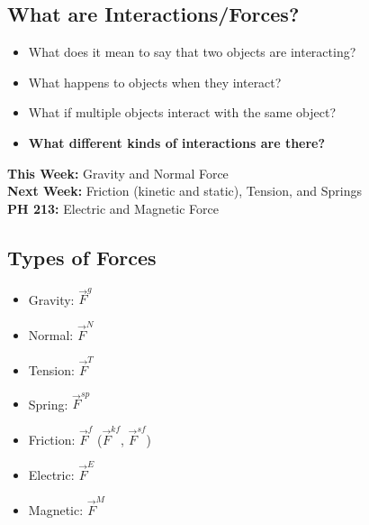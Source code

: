 \documentclass[]{article}
\begin{document}
\begin{PresentSpace}
\vspace{-10pt}
\section*{What are Interactions/Forces?}
\vspace{-10pt}
\begin{itemize}
	\item What does it mean to say that two objects are interacting?
	\item What happens to objects when they interact?
	\item What if multiple objects interact with the same object?
	\item \textbf{What different kinds of interactions are there?}
\end{itemize}
\end{PresentSpace}
\newpage
\begin{TeacherMargin}
\noindent\textbf{This Week:} Gravity and Normal Force \\
\textbf{Next Week:} Friction (kinetic and static), Tension, and Springs \\
\textbf{PH 213:} Electric and Magnetic Force
\end{TeacherMargin}
\begin{PresentSpace}
\vspace{-10pt}
\section*{Types of Forces}
\vspace{-10pt}
\begin{itemize}
	\item Gravity: $\vec{F}^{g}$
	\item Normal: $\vec{F}^{N}$
	\item Tension: $\vec{F}^{T}$
	\item Spring: $\vec{F}^{sp}$
	\item Friction: $\vec{F}^{f}$ ($\vec{F}^{kf}$, $\vec{F}^{sf}$)
	\item Electric: $\vec{F}^{E}$
	\item Magnetic: $\vec{F}^{M}$
\end{itemize}
\end{PresentSpace}
\newpage
\begin{TeacherMargin}

\end{TeacherMargin}
\end{document}

